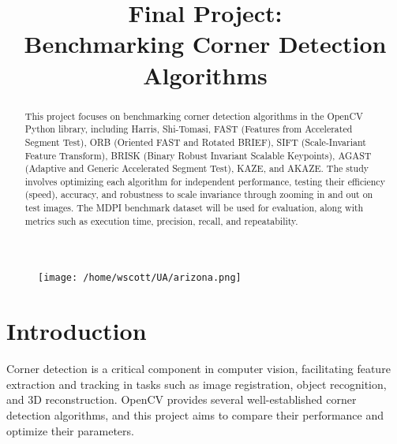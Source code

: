 \documentclass[journal]{IEEEtran}
\begin{document}
\title{Final Project:\\Benchmarking Corner Detection Algorithms}

\author{
}

\maketitle

\thispagestyle{plain}  %
\pagestyle{plain} 

\begin{figure}[H]
    \centering
    \begin{minipage}{\textwidth}
        \centering
    \texttt{[image: /home/wscott/UA/arizona.png]}
    \end{minipage}
\end{figure}

\onecolumn
\twocolumn
\pagebreak

\begin{abstract}
This project focuses on benchmarking corner detection algorithms in the OpenCV Python library, including Harris, Shi-Tomasi, FAST (Features from Accelerated Segment Test), ORB (Oriented FAST and Rotated BRIEF), SIFT (Scale-Invariant Feature Transform), BRISK (Binary Robust Invariant Scalable Keypoints), AGAST (Adaptive and Generic Accelerated Segment Test), KAZE, and AKAZE. The study involves optimizing each algorithm for independent performance, testing their efficiency (speed), accuracy, and robustness to scale invariance through zooming in and out on test images. The MDPI benchmark dataset will be used for evaluation, along with metrics such as execution time, precision, recall, and repeatability.
\end{abstract}

\section{Introduction}
Corner detection is a critical component in computer vision, facilitating feature extraction and tracking in tasks such as image registration, object recognition, and 3D reconstruction. OpenCV provides several well-established corner detection algorithms, and this project aims to compare their performance and optimize their parameters.
\end{document}
